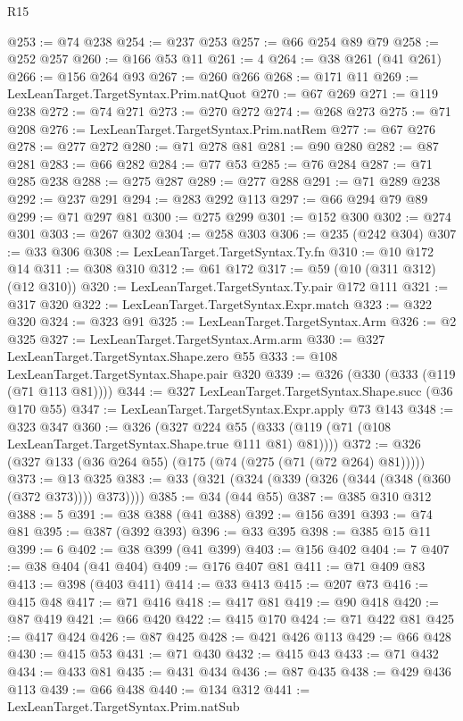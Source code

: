 \begin{lexlean}{R15}
\begin{coremodule}
@253 := @74 @238
@254 := @237 @253
@257 := @66 @254 @89 @79
@258 := @252 @257
@260 := @166 @53 @11
@261 := 4
@264 := @38 @261 (@41 @261)
@266 := @156 @264 @93
@267 := @260 @266
@268 := @171 @11
@269 := LexLeanTarget.TargetSyntax.Prim.natQuot
@270 := @67 @269
@271 := @119 @238
@272 := @74 @271
@273 := @270 @272
@274 := @268 @273
@275 := @71 @208
@276 := LexLeanTarget.TargetSyntax.Prim.natRem
@277 := @67 @276
@278 := @277 @272
@280 := @71 @278 @81
@281 := @90 @280
@282 := @87 @281
@283 := @66 @282
@284 := @77 @53
@285 := @76 @284
@287 := @71 @285 @238
@288 := @275 @287
@289 := @277 @288
@291 := @71 @289 @238
@292 := @237 @291
@294 := @283 @292 @113
@297 := @66 @294 @79 @89
@299 := @71 @297 @81
@300 := @275 @299
@301 := @152 @300
@302 := @274 @301
@303 := @267 @302
@304 := @258 @303
@306 := @235 (@242 @304)
@307 := @33 @306
@308 := LexLeanTarget.TargetSyntax.Ty.fn
@310 := @10 @172 @14
@311 := @308 @310
@312 := @61 @172
@317 := @59 (@10 (@311 @312) (@12 @310))
@320 := LexLeanTarget.TargetSyntax.Ty.pair @172 @111
@321 := @317 @320
@322 := LexLeanTarget.TargetSyntax.Expr.match
@323 := @322 @320
@324 := @323 @91
@325 := LexLeanTarget.TargetSyntax.Arm
@326 := @2 @325
@327 := LexLeanTarget.TargetSyntax.Arm.arm
@330 := @327 LexLeanTarget.TargetSyntax.Shape.zero @55
@333 := @108 LexLeanTarget.TargetSyntax.Shape.pair @320
@339 := @326 (@330 (@333 (@119 (@71 @113 @81))))
@344 := @327 LexLeanTarget.TargetSyntax.Shape.succ (@36 @170 @55)
@347 := LexLeanTarget.TargetSyntax.Expr.apply @73 @143
@348 := @323 @347
@360 := @326
    (@327 @224 @55 (@333 (@119 (@71 (@108 LexLeanTarget.TargetSyntax.Shape.true @111 @81) @81))))
@372 := @326 (@327 @133 (@36 @264 @55) (@175 (@74 (@275 (@71 (@72 @264) @81)))))
@373 := @13 @325
@383 := @33 (@321 (@324 (@339 (@326 (@344 (@348 (@360 (@372 @373)))) @373))))
@385 := @34 (@44 @55)
@387 := @385 @310 @312
@388 := 5
@391 := @38 @388 (@41 @388)
@392 := @156 @391
@393 := @74 @81
@395 := @387 (@392 @393)
@396 := @33 @395
@398 := @385 @15 @11
@399 := 6
@402 := @38 @399 (@41 @399)
@403 := @156 @402
@404 := 7
@407 := @38 @404 (@41 @404)
@409 := @176 @407 @81
@411 := @71 @409 @83
@413 := @398 (@403 @411)
@414 := @33 @413
@415 := @207 @73
@416 := @415 @48
@417 := @71 @416
@418 := @417 @81
@419 := @90 @418
@420 := @87 @419
@421 := @66 @420
@422 := @415 @170
@424 := @71 @422 @81
@425 := @417 @424
@426 := @87 @425
@428 := @421 @426 @113
@429 := @66 @428
@430 := @415 @53
@431 := @71 @430
@432 := @415 @43
@433 := @71 @432
@434 := @433 @81
@435 := @431 @434
@436 := @87 @435
@438 := @429 @436 @113
@439 := @66 @438
@440 := @134 @312
@441 := LexLeanTarget.TargetSyntax.Prim.natSub

\end{coremodule}
\end{lexlean}

